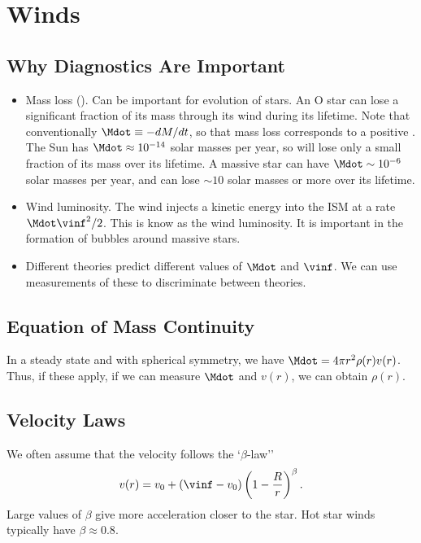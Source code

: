 \chapter{Winds}

\section{Why Diagnostics Are Important}

\begin{itemize}

\item Mass loss (\Mdot). Can be important for evolution of stars. An O star can lose a significant fraction of its mass through its wind during its lifetime. Note that conventionally $\Mdot \equiv -dM/dt$, so that mass loss corresponds to a positive \Mdot. The Sun has $\Mdot \approx  10^{-14}$ solar masses per year, so will lose only a small fraction of its mass over its lifetime. A massive star can have $\Mdot \sim 10^{-6}$ solar masses per year, and can lose $\sim 10$ solar masses or more over its lifetime.

\item Wind luminosity. The wind injects a  kinetic energy into the ISM at a rate $\Mdot \vinf^2/2$. This is know as the wind luminosity. It is important in the formation of bubbles around massive stars.

\item Different theories predict different values of $\Mdot$ and $\vinf$. We can use measurements of these to discriminate between theories.

\end{itemize}

\section{Equation of Mass Continuity}

In a steady state and with spherical symmetry, we have $\Mdot = 4\pi r^2 \rho(r) v(r)$. Thus, if these apply, if we can measure $\Mdot$ and $v(r)$, we can obtain $\rho(r)$.

\section{Velocity Laws}

We often assume that the velocity follows the `$\beta$-law''
$$
v(r) = v_0 + (\vinf - v_0)\left(1 - \frac{R}{r}\right)^\beta.
$$
Large values of $\beta$ give more acceleration closer to the star. Hot star winds typically have $\beta \approx 0.8$.

